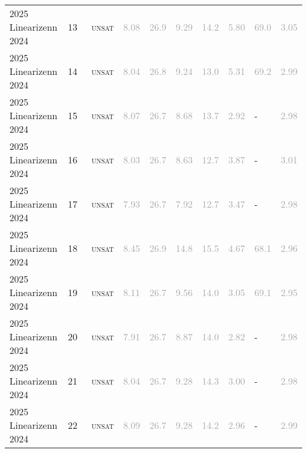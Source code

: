 \begin{center}
{\begin{longtable}{@{}llllllllll@{}}
2025 Linearizenn 2024 & 13 & ~\textsc{unsat} & \textcolor{darkgray}{8.08} & \textcolor{darkgray}{26.9} & \textcolor{darkgray}{9.29} & \textcolor{darkgray}{14.2} & \textcolor{darkgray}{5.80} & \textcolor{darkgray}{69.0} & \textcolor{darkgray}{3.05} \\
2025 Linearizenn 2024 & 14 & ~\textsc{unsat} & \textcolor{darkgray}{8.04} & \textcolor{darkgray}{26.8} & \textcolor{darkgray}{9.24} & \textcolor{darkgray}{13.0} & \textcolor{darkgray}{5.31} & \textcolor{darkgray}{69.2} & \textcolor{darkgray}{2.99} \\
2025 Linearizenn 2024 & 15 & ~\textsc{unsat} & \textcolor{darkgray}{8.07} & \textcolor{darkgray}{26.7} & \textcolor{darkgray}{8.68} & \textcolor{darkgray}{13.7} & \textcolor{darkgray}{2.92} & - & \textcolor{darkgray}{2.98} \\
2025 Linearizenn 2024 & 16 & ~\textsc{unsat} & \textcolor{darkgray}{8.03} & \textcolor{darkgray}{26.7} & \textcolor{darkgray}{8.63} & \textcolor{darkgray}{12.7} & \textcolor{darkgray}{3.87} & - & \textcolor{darkgray}{3.01} \\
2025 Linearizenn 2024 & 17 & ~\textsc{unsat} & \textcolor{darkgray}{7.93} & \textcolor{darkgray}{26.7} & \textcolor{darkgray}{7.92} & \textcolor{darkgray}{12.7} & \textcolor{darkgray}{3.47} & - & \textcolor{darkgray}{2.98} \\
2025 Linearizenn 2024 & 18 & ~\textsc{unsat} & \textcolor{darkgray}{8.45} & \textcolor{darkgray}{26.9} & \textcolor{darkgray}{14.8} & \textcolor{darkgray}{15.5} & \textcolor{darkgray}{4.67} & \textcolor{darkgray}{68.1} & \textcolor{darkgray}{2.96} \\
2025 Linearizenn 2024 & 19 & ~\textsc{unsat} & \textcolor{darkgray}{8.11} & \textcolor{darkgray}{26.7} & \textcolor{darkgray}{9.56} & \textcolor{darkgray}{14.0} & \textcolor{darkgray}{3.05} & \textcolor{darkgray}{69.1} & \textcolor{darkgray}{2.95} \\
2025 Linearizenn 2024 & 20 & ~\textsc{unsat} & \textcolor{darkgray}{7.91} & \textcolor{darkgray}{26.7} & \textcolor{darkgray}{8.87} & \textcolor{darkgray}{14.0} & \textcolor{darkgray}{2.82} & - & \textcolor{darkgray}{2.98} \\
2025 Linearizenn 2024 & 21 & ~\textsc{unsat} & \textcolor{darkgray}{8.04} & \textcolor{darkgray}{26.7} & \textcolor{darkgray}{9.28} & \textcolor{darkgray}{14.3} & \textcolor{darkgray}{3.00} & - & \textcolor{darkgray}{2.98} \\
2025 Linearizenn 2024 & 22 & ~\textsc{unsat} & \textcolor{darkgray}{8.09} & \textcolor{darkgray}{26.7} & \textcolor{darkgray}{9.28} & \textcolor{darkgray}{14.2} & \textcolor{darkgray}{2.96} & - & \textcolor{darkgray}{2.99} \\

\end{longtable}}
\end{center}
